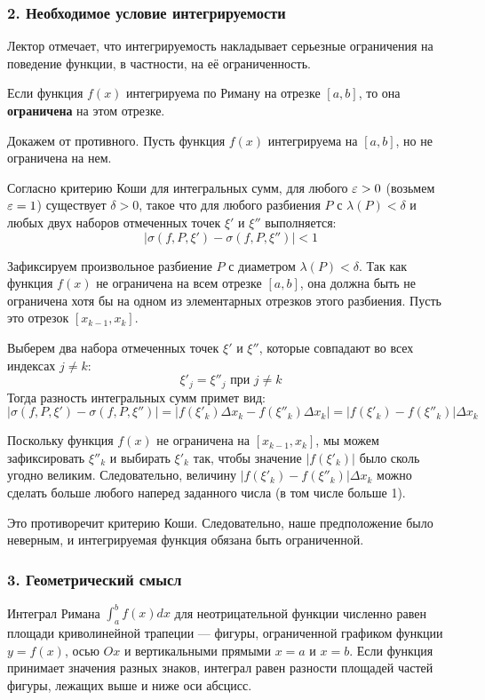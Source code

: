 \subsubsection*{2. Необходимое условие интегрируемости}

Лектор отмечает, что интегрируемость накладывает серьезные ограничения на поведение функции, в частности, на её ограниченность.

\begin{theorem}
Если функция $f(x)$ интегрируема по Риману на отрезке $[a, b]$, то она \textbf{ограничена} на этом отрезке.
\end{theorem}

\begin{tcolorbox}[title=Доказательство, breakable]
Докажем от противного. Пусть функция $f(x)$ интегрируема на $[a, b]$, но не ограничена на нем. 

Согласно критерию Коши для интегральных сумм, для любого $\varepsilon > 0$ (возьмем $\varepsilon = 1$) существует $\delta > 0$, такое что для любого разбиения $P$ с $\lambda(P) < \delta$ и любых двух наборов отмеченных точек $\xi'$ и $\xi''$ выполняется:
\[ |\sigma(f, P, \xi') - \sigma(f, P, \xi'')| < 1 \]

Зафиксируем произвольное разбиение $P$ с диаметром $\lambda(P) < \delta$. Так как функция $f(x)$ не ограничена на всем отрезке $[a, b]$, она должна быть не ограничена хотя бы на одном из элементарных отрезков этого разбиения. Пусть это отрезок $[x_{k-1}, x_k]$.

Выберем два набора отмеченных точек $\xi'$ и $\xi''$, которые совпадают во всех индексах $j \neq k$:
\[ \xi'_j = \xi''_j \text{ при } j \neq k \]
Тогда разность интегральных сумм примет вид:
\[ |\sigma(f, P, \xi') - \sigma(f, P, \xi'')| = |f(\xi'_k) \Delta x_k - f(\xi''_k) \Delta x_k| = |f(\xi'_k) - f(\xi''_k)| \Delta x_k \]

Поскольку функция $f(x)$ не ограничена на $[x_{k-1}, x_k]$, мы можем зафиксировать $\xi''_k$ и выбирать $\xi'_k$ так, чтобы значение $|f(\xi'_k)|$ было сколь угодно великим. Следовательно, величину $|f(\xi'_k) - f(\xi''_k)| \Delta x_k$ можно сделать больше любого наперед заданного числа (в том числе больше 1).

Это противоречит критерию Коши. Следовательно, наше предположение было неверным, и интегрируемая функция обязана быть ограниченной.
\end{tcolorbox}

\subsubsection*{3. Геометрический смысл}
Интеграл Римана $\int_a^b f(x) dx$ для неотрицательной функции численно равен площади криволинейной трапеции — фигуры, ограниченной графиком функции $y=f(x)$, осью $Ox$ и вертикальными прямыми $x=a$ и $x=b$. Если функция принимает значения разных знаков, интеграл равен разности площадей частей фигуры, лежащих выше и ниже оси абсцисс.

